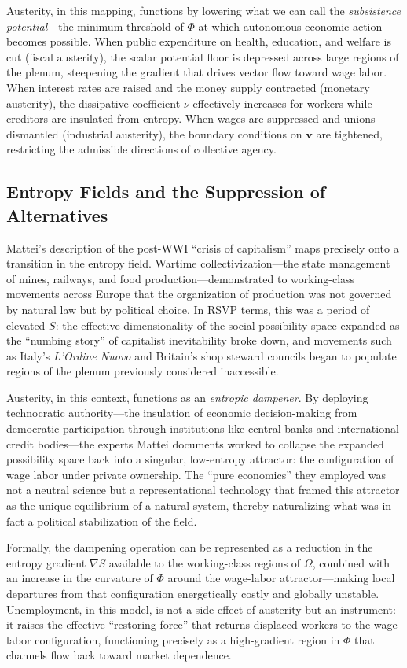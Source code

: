 \documentclass[12pt,a4paper]{article}
\begin{document}
Austerity, in this mapping, functions by lowering what we can call the \emph{subsistence potential}---the minimum threshold of $\Phi$ at which autonomous economic action becomes possible. When public expenditure on health, education, and welfare is cut (fiscal austerity), the scalar potential floor is depressed across large regions of the plenum, steepening the gradient that drives vector flow toward wage labor. When interest rates are raised and the money supply contracted (monetary austerity), the dissipative coefficient $\nu$ effectively increases for workers while creditors are insulated from entropy. When wages are suppressed and unions dismantled (industrial austerity), the boundary conditions on $\mathbf{v}$ are tightened, restricting the admissible directions of collective agency.

\subsection{Entropy Fields and the Suppression of Alternatives}

Mattei's description of the post-WWI ``crisis of capitalism'' maps precisely onto a transition in the entropy field. Wartime collectivization---the state management of mines, railways, and food production---demonstrated to working-class movements across Europe that the organization of production was not governed by natural law but by political choice. In RSVP terms, this was a period of elevated $S$: the effective dimensionality of the social possibility space expanded as the ``numbing story'' of capitalist inevitability broke down, and movements such as Italy's \emph{L'Ordine Nuovo} and Britain's shop steward councils began to populate regions of the plenum previously considered inaccessible.

Austerity, in this context, functions as an \emph{entropic dampener}. By deploying technocratic authority---the insulation of economic decision-making from democratic participation through institutions like central banks and international credit bodies---the experts Mattei documents worked to collapse the expanded possibility space back into a singular, low-entropy attractor: the configuration of wage labor under private ownership. The ``pure economics'' they employed was not a neutral science but a representational technology that framed this attractor as the unique equilibrium of a natural system, thereby naturalizing what was in fact a political stabilization of the field.

Formally, the dampening operation can be represented as a reduction in the entropy gradient $\nabla S$ available to the working-class regions of $\Omega$, combined with an increase in the curvature of $\Phi$ around the wage-labor attractor---making local departures from that configuration energetically costly and globally unstable. Unemployment, in this model, is not a side effect of austerity but an instrument: it raises the effective ``restoring force'' that returns displaced workers to the wage-labor configuration, functioning precisely as a high-gradient region in $\Phi$ that channels flow back toward market dependence.
\end{document}
